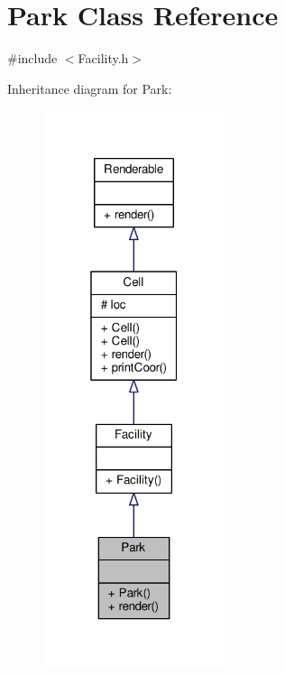 \hypertarget{classPark}{}\section{Park Class Reference}
\label{classPark}


{\ttfamily \#include $<$Facility.\+h$>$}



Inheritance diagram for Park\+:
\nopagebreak
\begin{figure}[H]
\begin{center}
\leavevmode
\includegraphics[width=151pt]{classPark__inherit__graph}
\end{center}
\end{figure}


